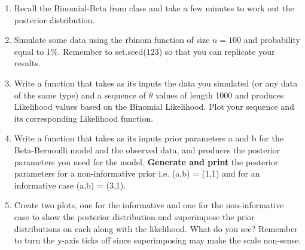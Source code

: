 \documentclass{article}
\begin{document}
\begin{enumerate}
\item Recall the Binomial-Beta from class and take a few minutes to work out the posterior distribution. 
\item{Simulate some data using the \textsf{rbinom} function of size $n = 100$ and probability equal to 1\%. Remember to \textsf{set.seed(123)} so that you can replicate your results.}
\item{Write a function that takes as its inputs the data you simulated (or any data of the same type) and a sequence of $\theta$ values of length 1000 and produces Likelihood values based on the Binomial Likelihood. Plot your sequence and its corresponding Likelihood function.}
\item{Write a function that takes as its inputs  prior parameters \textsf{a} and \textsf{b} for the Beta-Bernoulli model and the observed data, and produces the posterior parameters you need for the model. \textbf{Generate and print} the posterior parameters for a non-informative prior i.e. \textsf{(a,b) = (1,1)} and for an informative case \textsf{(a,b) = (3,1)}}.
\item{Create two plots, one for the informative and one for the non-informative case to show the posterior distribution and superimpose the prior distributions on each along with the likelihood. What do you see? Remember to turn the y-axis ticks off since superimposing may make the scale non-sense.}
\end{enumerate}
\end{document}
